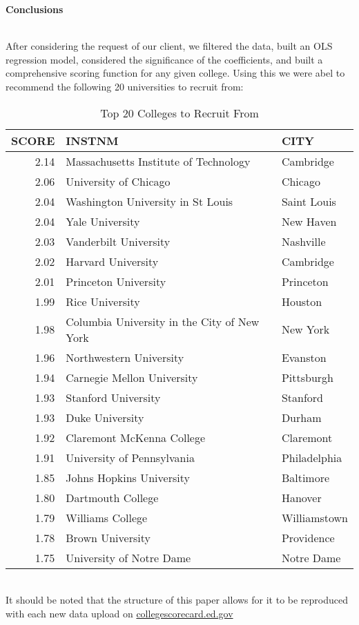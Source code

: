 \documentclass{article}
\begin{document}



{\large\textbf{Conclusions}} \\\

After considering the request of our client, we filtered the data, built an OLS regression model, considered the significance of the coefficients, and built a comprehensive scoring function for any given college. Using this we were abel to recommend the following 20 universities to recruit from:
\begin{table}[ht]
\centering
\begin{tabular}{rll}
  \hline
SCORE & INSTNM & CITY \\ 
  \hline
2.14 & Massachusetts Institute of Technology & Cambridge \\ 
  2.06 & University of Chicago & Chicago \\ 
  2.04 & Washington University in St Louis & Saint Louis \\ 
  2.04 & Yale University & New Haven \\ 
  2.03 & Vanderbilt University & Nashville \\ 
  2.02 & Harvard University & Cambridge \\ 
  2.01 & Princeton University & Princeton \\ 
  1.99 & Rice University & Houston \\ 
  1.98 & Columbia University in the City of New York & New York \\ 
  1.96 & Northwestern University & Evanston \\ 
  1.94 & Carnegie Mellon University & Pittsburgh \\ 
  1.93 & Stanford University & Stanford \\ 
  1.93 & Duke University & Durham \\ 
  1.92 & Claremont McKenna College & Claremont \\ 
  1.91 & University of Pennsylvania & Philadelphia \\ 
  1.85 & Johns Hopkins University & Baltimore \\ 
  1.80 & Dartmouth College & Hanover \\ 
  1.79 & Williams College & Williamstown \\ 
  1.78 & Brown University & Providence \\ 
  1.75 & University of Notre Dame & Notre Dame \\ 
   \hline
\end{tabular}
\caption{Top 20 Colleges to Recruit From} 
\end{table}\\
It should be noted that the structure of this paper allows for it to be reproduced with each new data upload on \href{https://collegescorecard.ed.gov/data}{collegescorecard.ed.gov}
\end{document}
